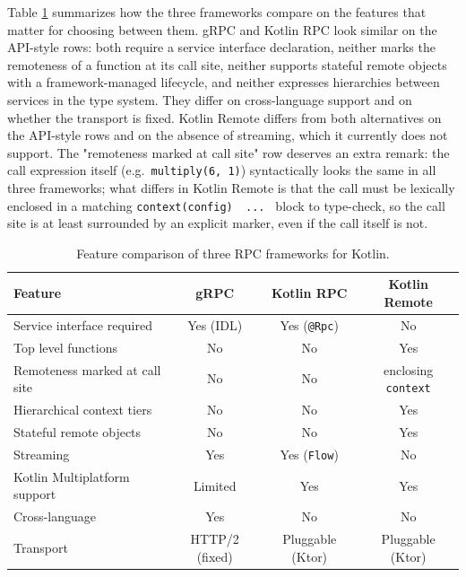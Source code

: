 \documentclass[a4paper,11pt,oneside]{article}
\newcommand{\kotlini}[1]{\texttt{#1}}
\begin{document}
Table \ref{features_table} summarizes how the three frameworks compare on the features that
matter for choosing between them. gRPC and Kotlin RPC look similar on the API-style rows: both
require a service interface declaration, neither marks the remoteness of a function at its call
site, neither supports stateful remote objects with a framework-managed lifecycle, and neither
expresses hierarchies between services in the type system. They differ on cross-language support
and on whether the transport is fixed. Kotlin Remote differs from both alternatives on the API-style
rows and on the absence of streaming, which it currently does not support. The
"remoteness marked at call site" row deserves an extra remark: the call expression itself
(e.g.\ \kotlini{multiply(6, 1)}) syntactically looks the same in all three frameworks; what
differs in Kotlin Remote is that the call must be lexically enclosed in a matching
\kotlini{context(config) { ... }} block to type-check, so the call site is at least surrounded
by an explicit marker, even if the call itself is not.

\begin{table}[!h]
	\begin{center}
		\begin{tabular}{lccc}
			\toprule
			Feature                        & gRPC           & Kotlin RPC           & Kotlin Remote               \\
			\midrule
			Service interface required     & Yes (IDL)      & Yes (\kotlini{@Rpc}) & No                          \\
			Top level functions            & No             & No                   & Yes                         \\
			Remoteness marked at call site & No             & No                   & enclosing \kotlini{context} \\
			Hierarchical context tiers     & No             & No                   & Yes                         \\
			Stateful remote objects        & No             & No                   & Yes                         \\
			Streaming                      & Yes            & Yes (\kotlini{Flow}) & No                          \\
			Kotlin Multiplatform support   & Limited        & Yes                  & Yes                         \\
			Cross-language                 & Yes            & No                   & No                          \\
			Transport                      & HTTP/2 (fixed) & Pluggable (Ktor)     & Pluggable (Ktor)            \\
			\bottomrule
		\end{tabular}
		\caption{Feature comparison of three RPC frameworks for Kotlin.}\label{features_table}
	\end{center}
\end{table}
\end{document}

